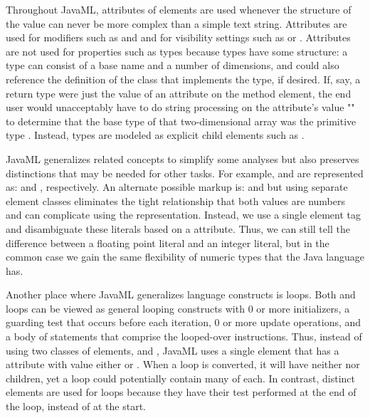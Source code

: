 \documentclass{article}
\begin{document}
Throughout JavaML, attributes of elements are used whenever the
structure of the value can never be more complex than a simple text
string.  Attributes are used for modifiers such as
 and  and for visibility settings
such as  or .  Attributes are not
used for properties such as types because types have some structure: a
type can consist of a base name and a number of dimensions, and could
also reference the definition of the class that implements the type, if
desired.  If, say, a return type were just the value of an attribute on
the method element, the end user would unacceptably have to do string
processing on the attribute's value "" to determine
that the base type of that two-dimensional array was the primitive type
.  Instead, types are modeled as explicit child elements
such as .

JavaML generalizes related concepts to simplify some analyses but also
preserves distinctions that may be needed for other tasks.  For example,
 and  are represented as:
 and
, respectively.  An
alternate possible markup is: 
and  but using separate element
classes eliminates the tight relationship that both values are numbers
and can complicate using the representation.  Instead, we use a single
element tag and disambiguate these literals based on a 
attribute. Thus, we can still tell the difference between a floating
point literal and an integer literal, but in the common case we gain the
same flexibility of numeric types that the Java language has.

Another place where JavaML generalizes language constructs is loops.
Both  and  loops can be viewed as general
looping constructs with 0 or more initializers, a guarding test that
occurs before each iteration, 0 or more update operations, and a body of
statements that comprise the looped-over instructions.  Thus, instead of
using two classes of elements,  and
, JavaML uses a single  element that
has a  attribute with value either  or
.  When a  loop is converted, it will
have neither  nor  children, yet
a  loop could potentially contain many of each.  In
contrast, distinct  elements are used for
 loops because they have their test performed at the end of
the loop, instead of at the start.
\end{document}
